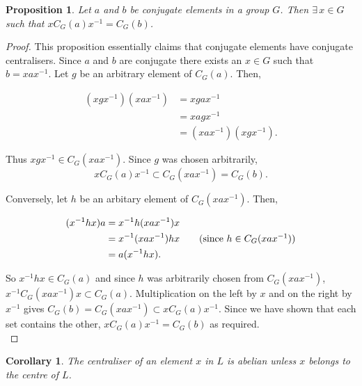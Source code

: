 \documentclass[a4paper , 11pt]{book}
\newtheorem{corollary}[theorem]{Corollary}
\newtheorem{proposition}[theorem]{Proposition}
\theoremstyle{definition}
\theoremstyle{remark}
\begin{document}
\begin{proposition} \label{conjcent} Let $a$ and $b$ be conjugate elements in a group $G$. Then $\exists \, x \in G$ such that $xC_G(a)x^{-1} = C_G(b)$. \vspace{3mm}
\end{proposition}

\begin{proof}
This proposition essentially claims that conjugate elements have conjugate centralisers. Since $a$ and $b$ are conjugate there exists an $x \! \in \! G$ such that $b = xax^{-1}$. Let $g$ be an arbitrary element of $C_G(a)$. Then,

\begin{align*} (xgx^{-1})(xax^{-1}) &= xgax^{-1} \\
&= xagx^{-1} \tag{since $g \in C_G(a)$} \\
&= (xax^{-1})(xgx^{-1}). \end{align*}

Thus $xgx^{-1} \in C_G(xax^{-1})$. Since $g$ was chosen arbitrarily, $$xC_G(a)x^{-1} \subset C_G(xax^{-1}) = C_G(b).$$ 

Conversely, let $h$ be an arbitary element of $C_G(xax^{-1})$. Then,

\begin{align*} (x^{-1}hx)a &= x^{-1}h(xax^{-1})x \\
&= x^{-1}(xax^{-1})hx \tag{since $h \in C_G(xax^{-1})$} \\
&= a(x^{-1}hx). \end{align*}

So $x^{-1}hx \in C_G(a)$ and since $h$ was arbitrarily chosen from $C_G(xax^{-1})$, \linebreak $x^{-1}C_G(xax^{-1})x \subset C_G(a)$. Multiplication on the left by $x$ and on the right by $x^{-1}$ gives $C_G(b) =  C_G(xax^{-1}) \subset xC_G(a)x^{-1}$. Since we have shown that each set contains the other, $xC_G(a)x^{-1} = C_G(b)$ as required. \\
\end{proof}

\begin{corollary}\label{6.5}
The centraliser of an element $x$ in $L$ is abelian unless $x$ belongs to the centre of $L$. \vspace{3mm}
\end{corollary}
\end{document}
